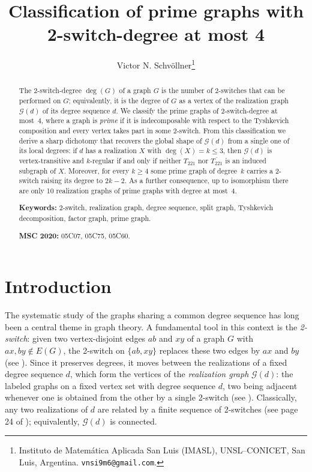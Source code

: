 \documentclass[11pt]{article}
\title{Classification of prime graphs with \\ 2-switch-degree at most 4}
\author{Victor N. Schv\"ollner\thanks{%
		Instituto de Matem\'atica Aplicada San Luis (IMASL), UNSL--CONICET,
		San Luis, Argentina. \texttt{vnsi9m6@gmail.com}.
}}
\date{}
\begin{document}
	\maketitle

\begin{abstract}
			The 2-switch-degree $\deg(G)$ of a graph $G$ is the number of
		2-switches that can be performed on $G$; equivalently, it is the degree
		of $G$ as a vertex of the realization graph $\mathcal{G}(d)$ of its
		degree sequence $d$. We classify the prime graphs of 2-switch-degree at
		most~4, where a graph is \emph{prime} if it is indecomposable with
		respect to the Tyshkevich composition and every vertex takes part in
		some 2-switch. From this classification we derive a sharp dichotomy
		that recovers the global shape of $\mathcal{G}(d)$ from a single one of
		its local degrees: if $d$ has a realization $X$ with $\deg(X)=k\le3$,
		then $\mathcal{G}(d)$ is vertex-transitive and $k$-regular if and only
		if neither $T_{221}$ nor $\overline{T_{221}}$ is an induced subgraph
		of $X$. Moreover, for every $k\geq 4$ some prime
		graph of degree~$k$ carries a 2-switch raising its degree to $2k-2$.
		As a further consequence, up to isomorphism there are only
		10 realization graphs of prime graphs with degree at most~4.
	
	\medskip
	\noindent\textbf{Keywords:} 2-switch, realization graph, degree sequence,
	split graph, Tyshkevich decomposition, factor graph, prime graph.
	
	\smallskip
	\noindent\textbf{MSC 2020:} 05C07, 05C75, 05C60.
\end{abstract}



\section{Introduction}

 

The systematic study of the graphs sharing a common degree sequence has
long been a central theme in graph theory. A fundamental tool in this
context is the \emph{2-switch}: given two vertex-disjoint edges $ab$ and
$xy$ of a graph $G$ with $ax,by\notin E(G)$, the 2-switch on
$\{ab,xy\}$ replaces these two edges by $ax$ and $by$
(see \cite{chartrand2010graphs}). 
Since it preserves degrees, it moves between the
realizations of a fixed degree sequence $d$, which form the vertices of
the \emph{realization graph} $\mathcal{G}(d)$: the labeled graphs on a
fixed vertex set with degree sequence $d$, two being adjacent whenever
one is obtained from the other by a single 2-switch
(see \cite{arikati1999realization}). Classically, any two realizations of
$d$ are related by a finite sequence of 2-switches (see page 24 of
\cite{chartrand2010graphs}); equivalently, $\mathcal{G}(d)$ is connected.
\end{document}
